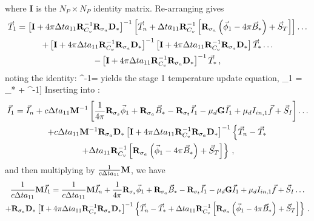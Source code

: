 where $\mathbf{I}$ is the $N_P \times N_P$ identity matrix.
Re-arranging gives
\begin{multline}
\vec{T}_1 = \left[ \mathbf{I} + 4\pi\Delta t a_{11}  \mathbf{R}_{C_v}^{-1}\mathbf{R}_{\sigma_a} \mathbf{D}_*    \right]^{-1}
\left[
\vec{T}_n + \Delta t a_{11}  \mathbf{R}_{C_v}^{-1}\left[ \mathbf{R}_{\sigma_a} \left(\vec{\phi}_1 - 4\pi\vec{B}_*  \right)+ \vec{S}_T \right]\right] \dots \\ 
+ 
\left[ \mathbf{I}  +  4\pi\Delta t a_{11}  \mathbf{R}_{C_v}^{-1}\mathbf{R}_{\sigma_a} \mathbf{D}_*   \right]^{-1}
\left[ \mathbf{I}  +  4\pi\Delta t a_{11}  \mathbf{R}_{C_v}^{-1}\mathbf{R}_{\sigma_a} \mathbf{D}_*    \right] \vec{T}_* \dots \\
- \left[ \mathbf{I}  +  4\pi\Delta t a_{11}  \mathbf{R}_{C_v}^{-1}\mathbf{R}_{\sigma_a} \mathbf{D}_*    \right]^{-1}\vec{T}_* \, ,
\end{multline}
noting the identity:
\benum
{}^{-1} = \I \pec
\eenum
%
yields the stage 1 temperature update equation,
\benum
{}_1 = _* + ^{-1}\left[\vec{T}_n - \vec{T}_* +  \Delta t a_{11}  \R{C_v}^{-1}\left[ \R{\sigma_a} \left(\vec{\phi}_1 - 4\pi\vec{B}_*\right) + \vec{S}_{T}\right]\right] \pep
\label{eq:iso_T1}
\eenum
%
%
Inserting  into :
\begin{multline}
\vec{I}_1 = \vec{I}_n + c\Delta t a_{11} \mathbf M^{-1}\left[   
\frac{1}{4\pi}\mathbf{R}_{\sigma_s}\vec{\phi}_1 + \mathbf{R}_{\sigma_a}\vec{B}_* - \mathbf{R}_{\sigma_t} \vec{I}_1 - \mu_d \mathbf{G}\vec{I}_1 + \mu_d I_{in,1}\vec{f} + \vec{S}_I \right] \dots  \\
+ c \Delta t a_{11} \mathbf M^{-1} \mathbf{R}_{\sigma_a} \mathbf{D}_* 
\left[ \mathbf{I}  + 4\pi\Delta t a_{11}  \mathbf{R}_{C_v}^{-1}\mathbf{R}_{\sigma_a} \mathbf{D}_*    \right]^{-1}
\left\{ \vec{T}_n - \vec{T}_* \right. \\
\left. +  \Delta t a_{11} \mathbf{R}_{C_v}^{-1}\left[ \mathbf{R}_{\sigma_a} \left(\vec{\phi}_1 - 4\pi\vec{B}_*\right) + \vec{S}_T \right]\right\} \, ,
\end{multline}
%
%
%
and then multiplying by $\frac{1}{c\Delta t a_{11}} \mathbf M$, we have
\begin{multline}
\frac{1}{c\Delta t a_{11}} \mathbf M\vec{I}_1 = \frac{1}{c\Delta t a_{11}} \mathbf M\vec{I}_n + 
\frac{1}{4\pi}\mathbf{R}_{\sigma_s}\vec{\phi}_1 + \mathbf{R}_{\sigma_a}\vec{B}_* - \mathbf{R}_{\sigma_t} \vec{I}_1 - \mu_d \mathbf{G}\vec{I}_1 + \mu_d I_{in,1}\vec{f}  + \vec{S}_I\dots  \\
+ \mathbf{R}_{\sigma_a}  \mathbf{D}_* 
\left[ \mathbf{I} + 4\pi\Delta t a_{11}  \mathbf{R}_{C_v}^{-1}\mathbf{R}_{\sigma_a} \mathbf{D}_*    \right]^{-1}
\left\{\vec{T}_n - \vec{T}_* +  \Delta t a_{11} \mathbf{R}_{C_v}^{-1}\left[ \mathbf{R}_{\sigma_a} \left(\vec{\phi}_1 - 4\pi\vec{B}_*\right) + \vec{S}_T\right]\right\}  \, .
\end{multline}
